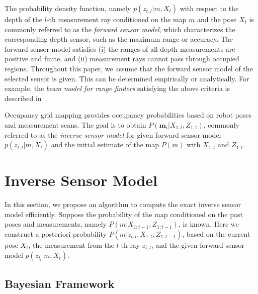 The probability density function, namely $p(z_{t,l}|m,X_t)$ with respect to the depth of the $l$-th measurement ray conditioned on the map $m$ and the pose $X_t$ is commonly referred to as the \emph{forward sensor model}, which characterizes the corresponding depth sensor, such as the maximum range or accuracy. The forward sensor model satisfies (i) the ranges of all depth measurements are positive and finite, and (ii) measurement rays cannot pass through occupied regions. Throughout this paper, we assume that the forward sensor model of the selected sensor is given. This can be determined empirically or analytically. For example, the \emph{beam model for range finders} satisfying  the above criteria is described in~\cite{ThrBurFox05}.

Occupancy grid mapping provides occupancy probabilities based on robot poses and measurement scans. The goal is to obtain $P(\mathbf{m}_i|X_{1:t},Z_{1:t})$, commonly referred to as the \emph{inverse sensor model} for given forward sensor model $p(z_{t,l}|m,X_t)$ and the initial estimate of the map $P(m)$ with $X_{1:t}$ and $Z_{1:t}$.


\section{Inverse Sensor Model}

In this section, we propose an algorithm to compute the exact inverse sensor model efficiently. 
Suppose the probability of the map conditioned on the past poses and measurements, namely $P(m|X_{1:t-1},Z_{1:t-1})$, is known. Here we construct a posteriori probability $P(m|z_{t,l},X_{1:t},Z_{1:t-1})$, based on the current pose $X_t$, the measurement from the $l$-th ray $z_{t,l}$, and the given forward sensor model $p(z_{t_l}|m,X_t)$.



\subsection{Bayesian Framework}

